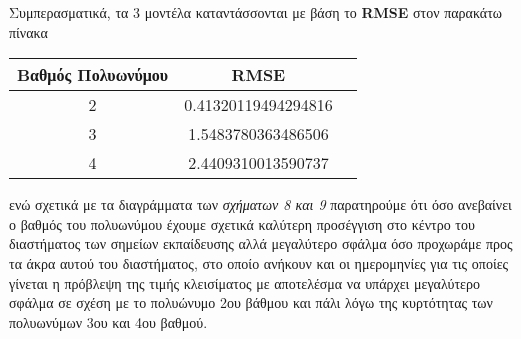 \documentclass[Second Project.tex]{subfiles}
\begin{document}
Συμπερασματικά, τα 3 μοντέλα καταντάσσονται με βάση το \textlatin{\textbf{RMSE}} στον παρακάτω πίνακα
\begin{center}
    \begin{tabular}{ |c|c|c| } 
     \hline
     Βαθμός Πολυωνύμου & \textlatin{RMSE} \\
     \hline
     2 & 0.41320119494294816 \\
     \hline
     3 & 1.5483780363486506 \\ 
     \hline
     4 & 2.4409310013590737 \\
     \hline
    \end{tabular}
\end{center}

ενώ σχετικά με τα διαγράμματα των \textit{σχήματων 8 και 9} παρατηρούμε ότι όσο ανεβαίνει ο βαθμός του 
πολυωνύμου έχουμε σχετικά καλύτερη προσέγγιση στο κέντρο του διαστήματος των σημείων εκπαίδευσης αλλά μεγαλύτερο 
σφάλμα όσο προχωράμε προς τα άκρα αυτού του διαστήματος, στο οποίο ανήκουν και οι ημερομηνίες για τις οποίες 
γίνεται η πρόβλεψη της τιμής κλεισίματος με αποτελέσμα να υπάρχει μεγαλύτερο σφάλμα σε σχέση με το πολυώνυμο 
2ου βάθμου και πάλι λόγω της κυρτότητας των πολυωνύμων 3ου και 4ου βαθμού. 
\end{document}
